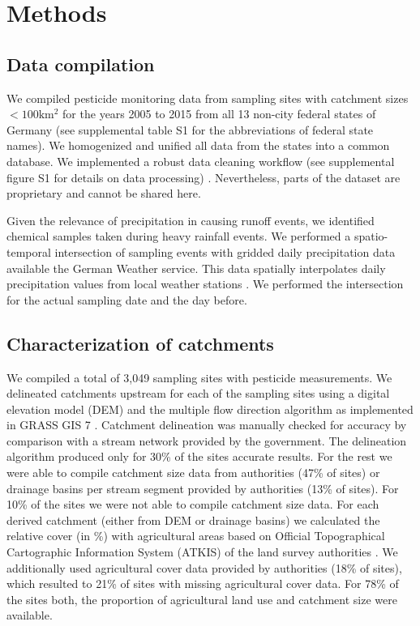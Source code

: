 \documentclass[journal=esthag,manuscript=article]{achemso}
\begin{document}




\section{Methods}
\subsection{Data compilation}
We compiled pesticide monitoring data from sampling sites with catchment sizes $\mathrm{< 100km^2}$ for the years 2005 to 2015 from all 13 non-city federal states of Germany (see supplemental table S1 for the abbreviations of federal state names). 
We homogenized and unified all data from the states into a common database.
We implemented a robust data cleaning workflow (see supplemental figure S1 for details on data processing) \citep{poisot_best_2015}.
Nevertheless, parts of the dataset are proprietary and cannot be shared here.

Given the relevance of precipitation in causing runoff events, we identified chemical samples taken during heavy rainfall events.
We performed a spatio-temporal intersection of sampling events with gridded daily precipitation data available the German Weather service.
This data spatially interpolates daily precipitation values from local weather stations \citep{rauthe_central_2013}. 
We performed the intersection for the actual sampling date and the day before.

\subsection{Characterization of catchments}
We compiled a total of 3,049 sampling sites with pesticide measurements.
We delineated catchments upstream for each of the sampling sites using a digital elevation model (DEM) \citep{eea_digital_2013} and the multiple flow direction algorithm \citep{holmgren_multiple_1994} as implemented in GRASS GIS 7 \citep{neteler_grass_2012}.
Catchment delineation was manually checked for accuracy by comparison with a stream network provided by the government.
The delineation algorithm produced only for 30\% of the sites accurate results.
For the rest we were able to compile catchment size data from authorities (47\% of sites) or drainage basins per stream segment provided by authorities (13\% of sites).
For 10\% of the sites we were not able to compile catchment size data.
For each derived catchment (either from DEM or drainage basins) we calculated the relative cover (in \%) with agricultural areas based on Official Topographical Cartographic Information System (ATKIS) of the land survey authorities \citep{adv_atkis_2016}.
We additionally used agricultural cover data provided by authorities (18\% of sites), which resulted to 21\% of sites with missing agricultural cover data. 
For 78\% of the sites both, the proportion of agricultural land use and catchment size were available.
\end{document}
